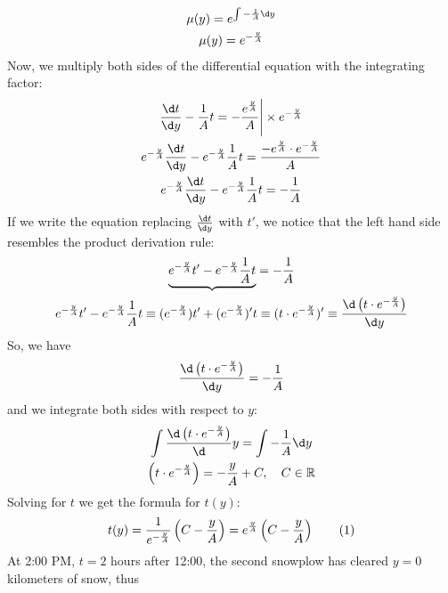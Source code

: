 \documentclass[a4paper,12pt]{article}
\newcommand\numberthis{\addtocounter{equation}{1}\tag{\theequation}}
\begin{document}
\begin{itemize}
\begin{gather*}
                \mu(y) = e^{\int -\frac{1}{A} \d y} \\
                \mu(y) = e^{-\frac{y}{A}}
            \end{gather*}
            Now, we multiply both sides of the differential equation with the integrating factor:
            \begin{gather*}
                \frac{\d t}{\d y} - \frac{1}{A}t = - \frac{e^{\frac{y}{A}}}{A} \Bigg| \times e^{-\frac{y}{A}} \\
                e^{-\frac{y}{A}} \frac{\d t}{\d y} - e^{-\frac{y}{A}} \frac{1}{A} t = \frac{-e^{\frac{y}{A}} \cdot e^{-\frac{y}{A}}}{A} \\
                e^{-\frac{y}{A}} \frac{\d t}{\d y} - e^{-\frac{y}{A}} \frac{1}{A} t = - \frac{1}{A}
            \end{gather*}
            If we write the equation replacing \(\frac{\d t}{\d y}\) with \(t'\), we notice that the left hand side resembles the product derivation rule:
            \begin{gather*}
                \underbrace{e^{-\frac{y}{A}} t' - e^{-\frac{y}{A}} \frac{1}{A} t} = - \frac{1}{A} \\
                e^{-\frac{y}{A}} t' - e^{-\frac{y}{A}} \frac{1}{A} t \equiv (e^{-\frac{y}{A}})t' + (e^{-\frac{y}{A}})'t \equiv (t \cdot e^{-\frac{y}{A}})' \equiv \frac{\d \left(t \cdot e^{-\frac{y}{A}}\right)}{\d y}
            \end{gather*}
            So, we have
            \begin{gather*}
                \frac{\d \left(t \cdot e^{-\frac{y}{A}}\right)}{\d y} = -\frac{1}{A}
            \end{gather*}
            and we integrate both sides with respect to \(y\):
            \begin{gather*}
                \int\frac{\d \left(t \cdot e^{-\frac{y}{A}}\right)} \d y= \int -\frac{1}{A} \d y \\
                \left(t \cdot e^{-\frac{y}{A}}\right) = -\frac{y}{A} + C, \quad C \in \mathbb{R}
            \end{gather*}
            Solving for \(t\) we get the formula for \(t(y)\):
            \begin{gather*}
                t(y) = \frac{1}{e^{-\frac{y}{A}}}\left(C-\frac{y}{A}\right) = e^\frac{y}{A}\left(C - \frac{y}{A}\right) \numberthis \label{eq:t(y)_initial}
            \end{gather*}
            At 2:00 PM, $t = 2$ hours after 12:00, the second snowplow has cleared $y = 0$ kilometers of snow, thus

\end{itemize}
\end{document}
